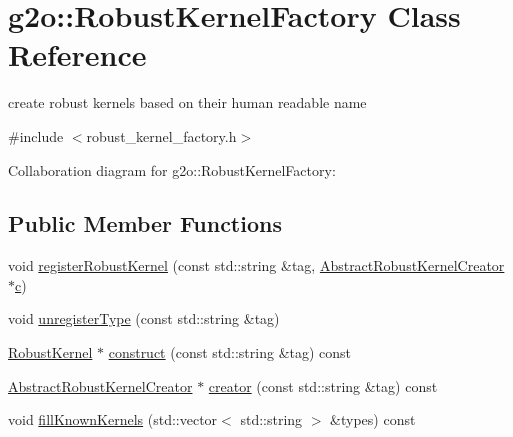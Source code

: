 \hypertarget{classg2o_1_1RobustKernelFactory}{}\section{g2o\+:\+:Robust\+Kernel\+Factory Class Reference}
\label{classg2o_1_1RobustKernelFactory}


create robust kernels based on their human readable name  




{\ttfamily \#include $<$robust\+\_\+kernel\+\_\+factory.\+h$>$}



Collaboration diagram for g2o\+:\+:Robust\+Kernel\+Factory\+:
\subsection*{Public Member Functions}
\begin{DoxyCompactItemize}
\item 
void \hyperlink{classg2o_1_1RobustKernelFactory_a71de3f228b58ae4a2dd965cc2cd8ff95}{register\+Robust\+Kernel} (const std\+::string \&tag, \hyperlink{classg2o_1_1AbstractRobustKernelCreator}{Abstract\+Robust\+Kernel\+Creator} $\ast$\hyperlink{sparse__helper_8cpp_a4e1e0e72dd773439e333c84dd762a9c3}{c})
\item 
void \hyperlink{classg2o_1_1RobustKernelFactory_af3b0dac653627b5f87c68d4180b87475}{unregister\+Type} (const std\+::string \&tag)
\item 
\hyperlink{classg2o_1_1RobustKernel}{Robust\+Kernel} $\ast$ \hyperlink{classg2o_1_1RobustKernelFactory_a59a1221d3b434f116291ee3b2f810ccf}{construct} (const std\+::string \&tag) const 
\item 
\hyperlink{classg2o_1_1AbstractRobustKernelCreator}{Abstract\+Robust\+Kernel\+Creator} $\ast$ \hyperlink{classg2o_1_1RobustKernelFactory_ad98d044ff87a05c7ab2a62bb18af0417}{creator} (const std\+::string \&tag) const 
\item 
void \hyperlink{classg2o_1_1RobustKernelFactory_a31dd636c46847a9099a2c55f77f1b4bc}{fill\+Known\+Kernels} (std\+::vector$<$ std\+::string $>$ \&types) const 
\end{DoxyCompactItemize}
